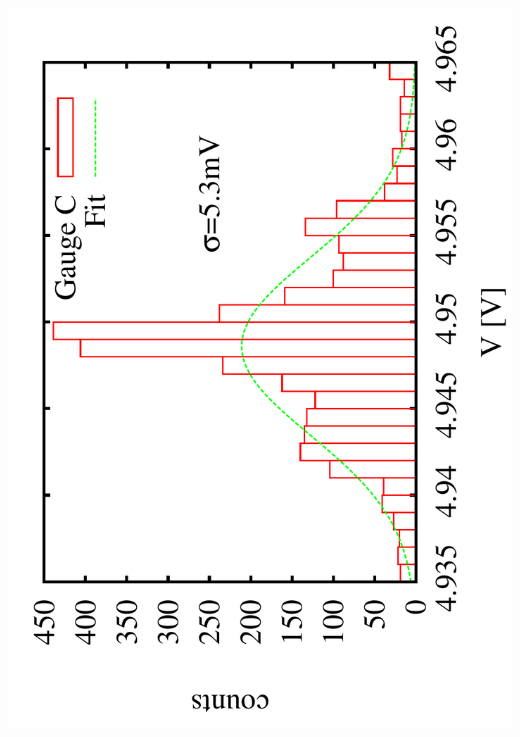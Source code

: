 \documentclass[a4paper,11pt]{book}
\begin{document}
 \includegraphics[scale=0.15,angle=-90]{image_ai_24e5.pdf}\par
 \vspace{1cm}
\\
\end{document}
